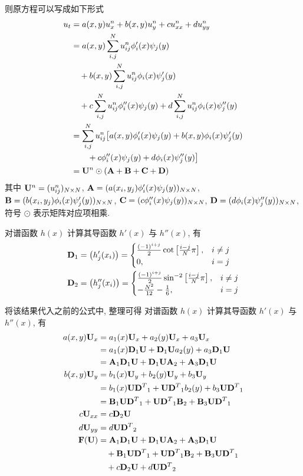 则原方程可以写成如下形式
\[ \begin{aligned}
u_t &= a(x, y) u_x^n + b(x, y) u_y^n + c u_{xx}^n + d u_{yy}^n \\
    &= a(x, y) \sum_{i, j}^N u_{ij}^n \phi_i'(x) \psi_j(y) \\
        &\quad+b(x, y)\sum_{i, j}^N u_{ij}^n \phi_i(x) \psi_j'(y) \\
        &\quad+c\sum_{i, j}^N u_{ij}^n \phi_i''(x) \psi_j(y)
        + d \sum_{i, j}^N u_{ij}^n \phi_i(x) \psi_j''(y) \\
    &= \sum_{i, j}^N u_{ij}^n \bigl[ a(x, y) \phi_i'(x) \psi_j(y)
        + b(x, y) \phi_i(x) \psi_j'(y) \\
        &\qquad+c \phi_i''(x) \psi_j(y) + d \phi_i(x) \psi_j''(y) \bigr] \\
    &= {\mathbf U}^n \odot ({\mathbf A} + {\mathbf B} + {\mathbf C} + {\mathbf D})
\end{aligned} \]
其中 ${\mathbf U}^n = (u_{ij}^n)_{N \times N}$,
$\mma = (a(x_i, y_j) \* \phi_i'(x) \* \psi_j(y))_{N \times N}$,
$\mmb = (b(x_i, y_j) \* \phi_i(x) \* \psi_j'(y))_{N \times N}$,
$\mmc = (c \* \phi_i''(x) \* \psi_j(y))_{N \times N}$,
$\mmd = (d \* \phi_i(x) \* \psi_j''(y))_{N \times N}$,
符号 $\odot$ 表示矩阵对应项相乘.

对谱函数 $h(x)$ 计算其导函数 $h'(x)$ 与 $h''(x)$, 有
\[ \begin{aligned}
{\mathbf D}_1 &= \bigl( h_j'(x_i) \bigr) = \begin{cases}
    \frac{(-1)^{i+j}}{2}\cot\left[\frac{i-j}{N}\pi\right], &i \ne j \\
    0, &i = j \end{cases} \\
{\mathbf D}_2 &= \bigl( h_j''(x_i) \bigr) = \begin{cases}
    \frac{(-1)^{i+j}}{2}\sin^{-2}\left[\frac{i-j}{N}\pi\right], &i \ne j \\
    -\frac{N^2}{12} - \frac{1}{6}, &i = j \end{cases}
\end{aligned} \]

将该结果代入之前的公式中, 整理可得
对谱函数 $h(x)$ 计算其导函数 $h'(x)$ 与 $h''(x)$, 有
\[ \begin{aligned}
a(x, y){\mathbf U}_x &= a_1(x){\mathbf U}_x + a_2(y){\mathbf U}_x + a_3{\mathbf U}_x \\
    &= a_1(x){\mathbf D}_1{\mathbf U} + {\mathbf D}_1{\mathbf U} a_2(y) + a_3{\mathbf D}_1{\mathbf U} \\
    &= {\mathbf A}_1{\mathbf D}_1{\mathbf U} + {\mathbf D}_1{\mathbf U}{\mathbf A}_2 + {\mathbf A}_3{\mathbf D}_1{\mathbf U} \\
b(x, y){\mathbf U}_y &= b_1(x){\mathbf U}_y + b_2(y){\mathbf U}_y + b_3{\mathbf U}_y \\
    &= b_1(x){\mathbf U}{{\mathbf D}^T}_1 + {\mathbf U}{{\mathbf D}^T}_1 b_2(y) + b_3{\mathbf U}{{\mathbf D}^T}_1\\
    &= {\mathbf B}_1{\mathbf U}{{\mathbf D}^T}_1 + {\mathbf U}{{\mathbf D}^T}_1{\mathbf B}_2 + {\mathbf B}_3{\mathbf U}{{\mathbf D}^T}_1 \\
c{\mathbf U}_{xx} &= c{\mathbf D}_2{\mathbf U} \\
d{\mathbf U}_{yy} &= d{\mathbf U}{{\mathbf D}^T}_2 \\
{\mathbf F}({\mathbf U}) &= {\mathbf A}_1{\mathbf D}_1{\mathbf U} + {\mathbf D}_1{\mathbf U}{\mathbf A}_2 + {\mathbf A}_3{\mathbf D}_1{\mathbf U} \\
    &\quad+ {\mathbf B}_1{\mathbf U}{{\mathbf D}^T}_1 + {\mathbf U}{{\mathbf D}^T}_1{\mathbf B}_2 + {\mathbf B}_3{\mathbf U}{{\mathbf D}^T}_1 \\
    &\quad+ c{\mathbf D}_2{\mathbf U} + d{\mathbf U}{{\mathbf D}^T}_2
\end{aligned} \]

